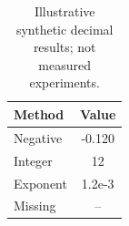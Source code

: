 \documentclass[10pt]{article}
\begin{document}
\begin{table}[t]
\centering
\caption{Illustrative synthetic decimal results; not measured experiments.}
\label{tab:decimal}
\begin{tabular}{@{}lS@{}}
\toprule
Method & {Value} \\
\midrule
Negative & -0.120 \\
Integer & 12 \\
Exponent & 1.2e-3 \\
Missing &  \\
\bottomrule
\end{tabular}
\end{table}
\end{document}
